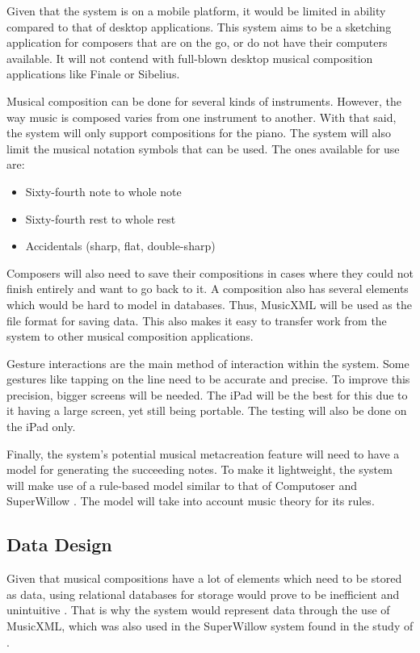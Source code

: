Given that the system is on a mobile platform, it would be limited in ability compared to that of desktop applications. This system aims to be a sketching application for composers that are on the go, or do not have their computers available. It will not contend with full-blown desktop musical composition applications like Finale or Sibelius.

Musical composition can be done for several kinds of instruments. However, the way music is composed varies from one instrument to another. With that said, the system will only support compositions for the piano. The system will also limit the musical notation symbols that can be used. The ones available for use are: 

\begin{itemize}
	\item Sixty-fourth note to whole note
    \item Sixty-fourth rest to whole rest
    \item Accidentals (sharp, flat, double-sharp)
\end{itemize}

Composers will also need to save their compositions in cases where they could not finish entirely and want to go back to it. A composition also has several elements which would be hard to model in databases. Thus, MusicXML will be used as the file format for saving data. This also makes it easy to transfer work from the system to other musical composition applications.

Gesture interactions are the main method of interaction within the system. Some gestures like tapping on the line need to be accurate and precise. To improve this precision, bigger screens will be needed. The iPad will be the best for this due to it having a large screen, yet still being portable. The testing will also be done on the iPad only.

Finally, the system's potential musical metacreation feature will need to have a model for generating the succeeding notes. To make it lightweight, the system will make use of a rule-based model similar to that of Computoser \citep{bozhanov2014computoser} and SuperWillow \citep{schulze2011music}. The model will take into account music theory for its rules.

\subsection{Data Design}

Given that musical compositions have a lot of elements which need to be stored as data, using relational databases for storage would prove to be inefficient and unintuitive \citep{hristidis2003efficient}. That is why the system would represent data through the use of MusicXML, which was also used in the SuperWillow system found in the study of \citeauthor{schulze2011music}.

